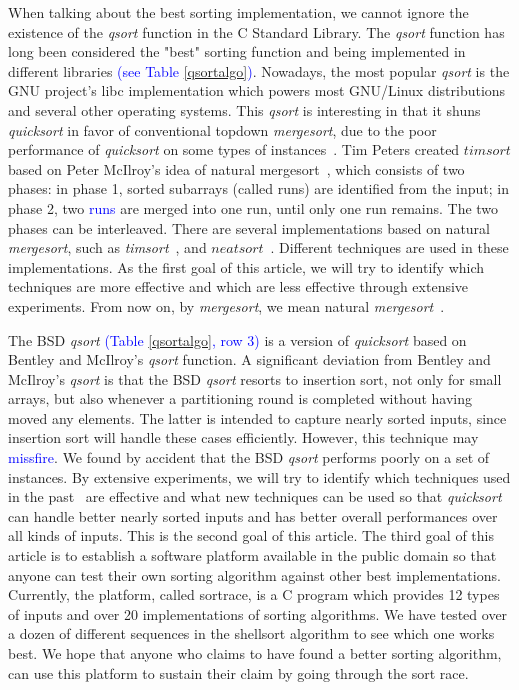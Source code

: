\documentclass[AMA,STIX1COL]{WileyNJD-v2}
\newcommand{\qusort}{\emph{quicksort }}
\newcommand{\qsort}{\emph{qsort }}
\newcommand{\tsortn}{\emph{timsort}}
\newcommand{\msortn}{\emph{mergesort}}
\begin{document}
When talking about the best sorting implementation, we cannot ignore the existence of the \qsort function in the C Standard Library.
The \qsort function has long been considered the "best" sorting function and being implemented in different libraries \textcolor{blue}{(see Table \ref{qsortalgo})}. 
Nowadays, the most popular \qsort is the GNU project’s libc implementation which powers most GNU/Linux distributions and several other operating systems. 
This \qsort is interesting in that it shuns \qusort in favor of conventional topdown \msortn, due to the poor performance of \qusort on some types of instances~\cite{gnumergesort}.  
Tim Peters created $timsort$ based on Peter McIlroy’s idea of natural mergesort~\cite{mcilroy1993optimistic}, which consists of two phases: in phase 1, sorted subarrays (called runs) are identified from the input; in phase 2, two \textcolor{blue}{runs} are merged into one run, until only one run remains. 
The two phases can be interleaved. 
There are several implementations based on natural \msortn, such as \tsortn~\cite{timsort}, and $neatsort$~\cite{la2014neatsort}. 
Different techniques are used in these implementations. 
As the first goal of this article, we will try to identify which techniques are more effective and which are less effective through extensive experiments. 
From now on, by \msortn, we mean natural \msortn~\cite{mcilroy1993optimistic}.

The BSD \qsort \textcolor{blue}{(Table \ref{qsortalgo}, row 3)} is a version of \qusort based on Bentley and McIlroy’s \qsort function. 
A significant deviation from Bentley and McIlroy’s \qsort is that the BSD \qsort resorts to insertion sort, not only for small arrays, but also whenever a partitioning round is completed without having moved any elements. 
The latter is intended to capture nearly sorted inputs, since insertion sort will handle these cases efficiently. 
However, this technique may \textcolor{blue}{missfire}. We found by accident that the BSD \qsort performs poorly on a set of instances. 
By extensive experiments, we will try to identify which techniques used in the past~\cite{sedgewick1978implementing} are effective and what new techniques can be used so that \qusort can handle better nearly sorted inputs and has better overall performances over all kinds of inputs. 
This is the second goal of this article.
The third goal of this article is to establish a software platform available in the public domain so that anyone can test their own sorting algorithm against other best implementations. 
Currently, the platform, called sortrace, is a C program which provides 12 types of inputs and over 20 implementations of sorting algorithms. 
We have tested over a dozen of different sequences in the shellsort algorithm to see which one works best. 
We hope that anyone who claims to have found a better sorting algorithm, can use this platform to sustain their claim by going through the sort race.  
\end{document}
